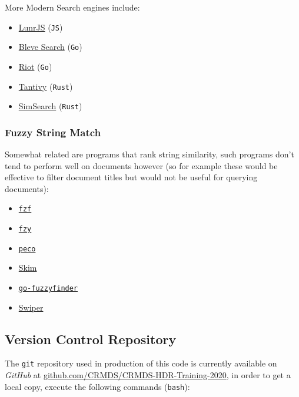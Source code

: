 \documentclass[a4paper,11pt,twoside]{article}
\begin{document}
More Modern Search engines include:

\begin{itemize}
\item \href{https://github.com/olivernn/lunr.js/}{LunrJS}  (\texttt{JS}) \cite{nightingaleOlivernnLunrJs2021}
\item \href{https://github.com/blevesearch/bleve}{Bleve Search} (\texttt{Go}) \cite{martyschochBleveSearchDocumentation}
\item \href{https://github.com/go-ego/riot}{Riot} (\texttt{Go}) \cite{vzGoegoRiot2021}
\item \href{https://github.com/tantivy-search/tantivy}{Tantivy} (\texttt{Rust}) \cite{clementrenaultMeilisearchMeiliSearch2021}
\item \href{https://github.com/andylokandy/simsearch-rs}{SimSearch} (\texttt{Rust}) \cite{lokAndylokandySimsearchrs2021}
\end{itemize}


\subsubsection{Fuzzy String Match}
\label{sec:org81aa600}
Somewhat related are programs that rank string similarity, such programs don't tend
to perform well on documents however (so for example these would
be effective to filter document titles but would not be useful for
querying documents):

\begin{itemize}
\item \href{https://github.com/junegunn/fzf}{\texttt{fzf}} \cite{choiJunegunnFzf2021}
\item \href{https://github.com/jhawthorn/fzy}{\texttt{fzy}} \cite{hawthornJhawthornFzy2021}
\item \href{https://github.com/peco/peco}{\texttt{peco}} \cite{lestrratPecoPeco2021}
\item \href{https://github.com/lotabout/skim}{Skim} \cite{zhangLotaboutSkim2021}
\item \href{https://github.com/lotabout/skim}{\texttt{go-fuzzyfinder}} \cite{ktrKtr0731Gofuzzyfinder2021}
\item \href{https://github.com/lotabout/skim}{Swiper} \cite{krehelAboaboSwiper2021}
\end{itemize}

\subsection{Version Control Repository}
\label{sec:org4ffd3bb}
The \texttt{git} repository used in production of this code is currently
available on \emph{GitHub} at \href{https://github.com/CRMDS/CRMDS-HDR-Training-2020}{github.com/CRMDS/CRMDS-HDR-Training-2020}, in
order to get a local copy, execute the following commands (\texttt{bash}): 
\end{document}
